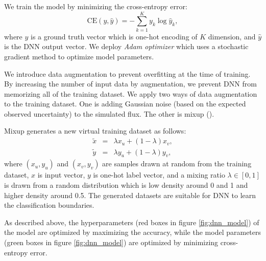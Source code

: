 \documentclass[useamsfonts]{pasj01}
\begin{document}
We train the model by minimizing the cross-entropy error: 
\begin{equation}
\mathrm{CE} \left(y, \hat{y} \right) =　-\sum_{k = 1}^K y_k \log \hat{y}_k,
\end{equation}
where $y$ is a ground truth vector which is one-hot encoding of $K$ dimension, and $\hat{y}$ is the DNN output vector.
We deploy {\it Adam optimizer} which uses a stochastic gradient method to optimize model parameters.

We introduce data augmentation to prevent overfitting at the time of training.
By increasing the number of input data by augmentation, we prevent DNN from memorizing all of the training dataset.
We apply two ways of data augmentation to the training dataset.
One is adding Gaussian noise (based on the expected observed uncertainty) to the simulated flux.
The other is mixup (\cite{mixup}).

Mixup generates a new virtual training dataset as follows:
\begin{eqnarray*}
    \tilde{x} &=& \lambda x_u + \left( 1-\lambda \right) x_v, \\
    \tilde{y} &=& \lambda y_u + \left( 1-\lambda \right) y_v,
\end{eqnarray*}
where $\left(x_u, y_u\right)$ and $\left(x_v, y_v\right)$ are samples drawn at random from the training dataset, $x$ is input vector, $y$ is one-hot label vector, 
and a mixing ratio $\lambda \in \left[0, 1\right]$ is drawn from a random distribution which is low density around 0 and 1 and higher density around 0.5. 
The generated datasets are suitable for DNN to learn the classification boundaries.

As described above, the hyperparameters (red boxes in figure \ref{fig:dnn_model}) of the model are optimized by maximizing the accuracy, while 
the model parameters (green boxes in figure \ref{fig:dnn_model}) are optimized by minimizing cross-entropy error.
%
%
\end{document}
